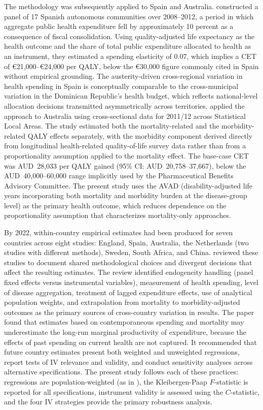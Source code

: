 \documentclass[11pt]{article}
\numberwithin{equation}{section}
\theoremstyle{remark}
\begin{document}
The methodology was subsequently applied to Spain and Australia. \citet{Vallejo2018} constructed a panel of 17 Spanish autonomous communities over 2008--2012, a period in which aggregate public health expenditure fell by approximately 10 percent as a consequence of fiscal consolidation. Using quality-adjusted life expectancy as the health outcome and the share of total public expenditure allocated to health as an instrument, they estimated a spending elasticity of 0.07, which implies a CET of \euro21,000--\euro24,000 per QALY, below the \euro30,000 figure commonly cited in Spain without empirical grounding. The austerity-driven cross-regional variation in health spending in Spain is conceptually comparable to the cross-municipal variation in the Dominican Republic's health budget, which reflects national-level allocation decisions transmitted asymmetrically across territories. \citet{Edney2018} applied the approach to Australia using cross-sectional data for 2011/12 across Statistical Local Areas. The study estimated both the mortality-related and the morbidity-related QALY effects separately, with the morbidity component derived directly from longitudinal health-related quality-of-life survey data rather than from a proportionality assumption applied to the mortality effect. The base-case CET was AUD~28,033 per QALY gained (95\% CI: AUD~20,758--37,667), below the AUD~40,000--60,000 range implicitly used by the Pharmaceutical Benefits Advisory Committee. The present study uses the AVAD (disability-adjusted life years incorporating both mortality and morbidity burden at the disease-group level) as the primary health outcome, which reduces dependence on the proportionality assumption that characterizes mortality-only approaches.

By 2022, within-country empirical estimates had been produced for seven countries across eight studies: England, Spain, Australia, the Netherlands (two studies with different methods), Sweden, South Africa, and China. \citet{Edney2022} reviewed these studies to document shared methodological choices and divergent decisions that affect the resulting estimates. The review identified endogeneity handling (panel fixed effects versus instrumental variables), measurement of health spending, level of disease aggregation, treatment of lagged expenditure effects, use of analytical population weights, and extrapolation from mortality to morbidity-adjusted outcomes as the primary sources of cross-country variation in results. The paper found that estimates based on contemporaneous spending and mortality may underestimate the long-run marginal productivity of expenditure, because the effects of past spending on current health are not captured. It recommended that future country estimates present both weighted and unweighted regressions, report tests of IV relevance and validity, and conduct sensitivity analyses across alternative specifications. The present study follows each of these practices: regressions are population-weighted (as in \citet{Claxton2015}), the Kleibergen-Paap $F$-statistic is reported for all specifications, instrument validity is assessed using the $C$-statistic, and the four IV strategies provide the primary robustness analysis.
\end{document}
